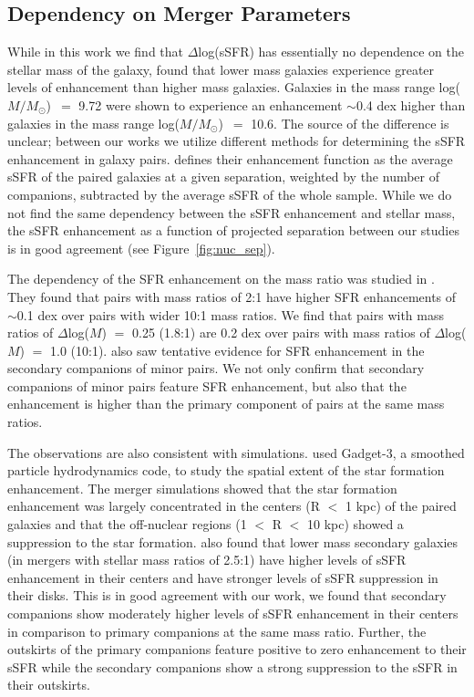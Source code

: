 \documentclass[iop,revtex4,twocolumn,apj,numberedappendix,appendixfloats]{emulateapj}
\newcommand{\logm}{log($M/M_{\odot}$)}
\begin{document}
\subsection{Dependency on Merger Parameters}

While in this work we find that $\Delta$log(sSFR) has essentially no dependence on the stellar mass of the galaxy, \citet{Li:2008} found that lower mass galaxies experience greater levels of enhancement than higher mass galaxies. Galaxies in the mass range \logm\ $=$ 9.72 were shown to experience an enhancement $\sim$0.4 dex higher than galaxies in the mass range \logm\ $=$ 10.6. The source of the difference is unclear; between our works we utilize different methods for determining the sSFR enhancement in galaxy pairs. \citet{Li:2008} defines their enhancement function as the average sSFR of the paired galaxies at a given separation, weighted by the number of companions, subtracted by the average sSFR of the whole sample. While we do not find the same dependency between the sSFR enhancement and stellar mass, the sSFR enhancement as a function of projected separation between our studies is in good agreement (see Figure~\ref{fig:nuc_sep}).

The dependency of the SFR enhancement on the mass ratio was studied in \citet{Ellison:2008}. They found that pairs with mass ratios of 2:1 have higher SFR enhancements of $\sim$0.1 dex over pairs with wider 10:1 mass ratios. We find that pairs with mass ratios of $\Delta$log($M$) $=$ 0.25 (1.8:1) are 0.2 dex over pairs with mass ratios of $\Delta$log($M$) $=$ 1.0 (10:1). \citet{Ellison:2008} also saw tentative evidence for SFR enhancement in the secondary companions of minor pairs. We not only confirm that secondary companions of minor pairs feature SFR enhancement, but also that the enhancement is higher than the primary component of pairs at the same mass ratios. 

The observations are also consistent with simulations. \citet{Moreno:2015} used {\sc Gadget}-3, a smoothed particle hydrodynamics code, to study the spatial extent of the star formation enhancement. The merger simulations showed that the star formation enhancement was largely concentrated in the centers (R $<$ 1 kpc) of the paired galaxies and that the off-nuclear regions (1 $<$ R $<$ 10 kpc) showed a suppression to the star formation. \citet{Moreno:2015} also found that lower mass secondary galaxies (in mergers with stellar mass ratios of 2.5:1) have higher levels of sSFR enhancement in their centers and have stronger levels of sSFR suppression in their disks. This is in good agreement with our work, we found that secondary companions show moderately higher levels of sSFR enhancement in their centers in comparison to primary companions at the same mass ratio. Further, the outskirts of the primary companions feature positive to zero enhancement to their sSFR while the secondary companions show a strong suppression to the sSFR in their outskirts. 
\end{document}
